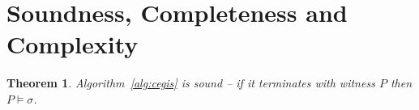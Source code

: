 \documentclass[preprint]{sigplanconf}
\newtheorem{theorem}{Theorem}
\newtheorem{conjecture}[theorem]{Conjecture}
\theoremstyle{definition}
\begin{document}

\iffalse
We begin by observing that the asymptotic complexity of all of our synthesis
backends are equal, assuming $P \neq NP$.  This complexity is:

$$O\left(2^{K(f)}\right)$$

Where $K(f)$ is the Kolmogorov complexity of $f$, which is $O(\log Y^X) = O(X)$
so the complexity is doubly exponential in the width of $X$.


\begin{theorem}
 Fitness landscapes form a lattice.  Adding test vectors corresponds to abstraction refinement on this
 lattice, which is why incremental GP works well.
\end{theorem}

\begin{proof}
 Trivial.
\end{proof}


\begin{conjecture}
 A single fitness landscape isn't really very smooth (e.g. small changes in program representation
 don't correspond to small changes in fitness), so GP probably shouldn't work very well.

 But it does.
\end{conjecture}
\fi


\section{Soundness, Completeness and Complexity}
\begin{theorem}
 \label{thm:synth-sound}
 Algorithm~\ref{alg:cegis} is sound -- if it terminates with witness $P$ then
 $P \models \sigma$.
\end{theorem}
\end{document}
